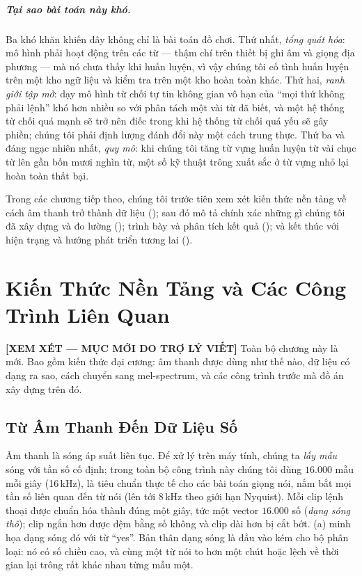 \documentclass[12pt,a4paper]{report}
\newcommand{\reviewnote}[1]{%
  \par\smallskip\noindent
  \colorbox{yellow!35}{\parbox{0.97\linewidth}{\small\textbf{[XEM XÉT — MỤC MỚI DO TRỢ LÝ VIẾT]}\; #1}}%
  \par\smallskip}
\begin{document}
\paragraph{Tại sao bài toán này khó.}
Ba khó khăn khiến đây không chỉ là bài toán đồ chơi. Thứ nhất, \emph{tổng quát
hóa}: mô hình phải hoạt động trên các từ --- thậm chí trên thiết bị ghi âm và
giọng địa phương --- mà nó chưa thấy khi huấn luyện, vì vậy chúng tôi cố tình
huấn luyện trên một kho ngữ liệu và kiểm tra trên một kho hoàn toàn khác. Thứ
hai, \emph{ranh giới tập mở}: dạy mô hình từ chối tự tin không gian vô hạn của
``mọi thứ không phải lệnh'' khó hơn nhiều so với phân tách một vài từ đã biết, và
một hệ thống từ chối quá mạnh sẽ trở nên điếc trong khi hệ thống từ chối quá yếu
sẽ gây phiền; chúng tôi phải định lượng đánh đổi này một cách trung thực. Thứ ba
và đáng ngạc nhiên nhất, \emph{quy mô}: khi chúng tôi tăng từ vựng huấn luyện từ
vài chục từ lên gần bốn mươi nghìn từ, một số kỹ thuật trông xuất sắc ở từ vựng
nhỏ lại hoàn toàn thất bại.

Trong các chương tiếp theo, chúng tôi trước tiên xem xét kiến thức nền tảng về
cách âm thanh trở thành dữ liệu (); sau đó mô tả chính xác
những gì chúng tôi đã xây dựng và đo lường (); trình bày và phân
tích kết quả (); và kết thúc với hiện trạng và hướng phát triển
tương lai ().

\chapter{Kiến Thức Nền Tảng và Các Công Trình Liên Quan}\label{ch:background}
\reviewnote{Toàn bộ chương này là mới. Bao gồm kiến thức đại cương: âm thanh được
dùng như thế nào, dữ liệu có dạng ra sao, cách chuyển sang mel-spectrum, và các
công trình trước mà đồ án xây dựng trên đó.}

\section{Từ Âm Thanh Đến Dữ Liệu Số}\label{sec:sound2data}

Âm thanh là sóng áp suất liên tục. Để xử lý trên máy tính, chúng ta
\emph{lấy mẫu} sóng với tần số cố định; trong toàn bộ công trình này chúng tôi
dùng $16{.}000$ mẫu mỗi giây (16\,kHz), là tiêu chuẩn thực tế cho các bài toán
giọng nói, nắm bắt mọi tần số liên quan đến từ nói (lên tới 8\,kHz theo giới hạn
Nyquist). Mỗi clip lệnh thoại được chuẩn hóa thành đúng một giây, tức một vector
$16{.}000$ số (\emph{dạng sóng thô}); clip ngắn hơn được đệm bằng số không và clip
dài hơn bị cắt bớt. (a) minh họa dạng sóng đó với từ ``yes''.
Bản thân dạng sóng là đầu vào kém cho bộ phân loại: nó có số chiều cao, và cùng
một từ nói to hơn một chút hoặc lệch về thời gian lại trông rất khác nhau từng
mẫu một.
\end{document}
